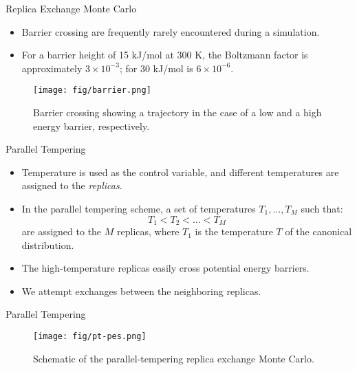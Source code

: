\documentclass[10pt]{beamer}
\begin{document}
\begin{frame}{Replica Exchange Monte Carlo}
\begin{itemize}
\setlength\itemsep{1em}
  \item Barrier crossing are frequently rarely encountered during a simulation.

  \item For a barrier height of 15 kJ/mol at 300 K, the Boltzmann factor is approximately $3\times 10^{-3}$; for 30 kJ/mol is $6\times 10^{-6}$.
\end{itemize}
\begin{figure}
  \texttt{[image: fig/barrier.png]}
  \caption{Barrier crossing showing a trajectory in the case of a low and a high energy barrier, respectively.}
\end{figure}
\end{frame}

\begin{frame}{Parallel Tempering}
\begin{itemize}
\setlength\itemsep{1em}
  \item Temperature is used as the control variable, and different temperatures are assigned to the \textit{replicas}.

  \item In the parallel tempering scheme, a set of temperatures $T_1,\dots,T_M$ such that:
  \begin{equation}
    T_1 < T_2 < \dots < T_M
  \end{equation}
  are assigned to the $M$ replicas, where $T_1$ is the temperature $T$ of the canonical distribution.

  \item The high-temperature replicas easily cross potential energy barriers.

  \item We attempt exchanges between the neighboring replicas.
\end{itemize}
\end{frame}

\begin{frame}{Parallel Tempering}
\begin{figure}
  \texttt{[image: fig/pt-pes.png]}
  \caption{Schematic of the parallel-tempering replica exchange Monte Carlo.}
\end{figure}
\end{frame}
\end{document}
